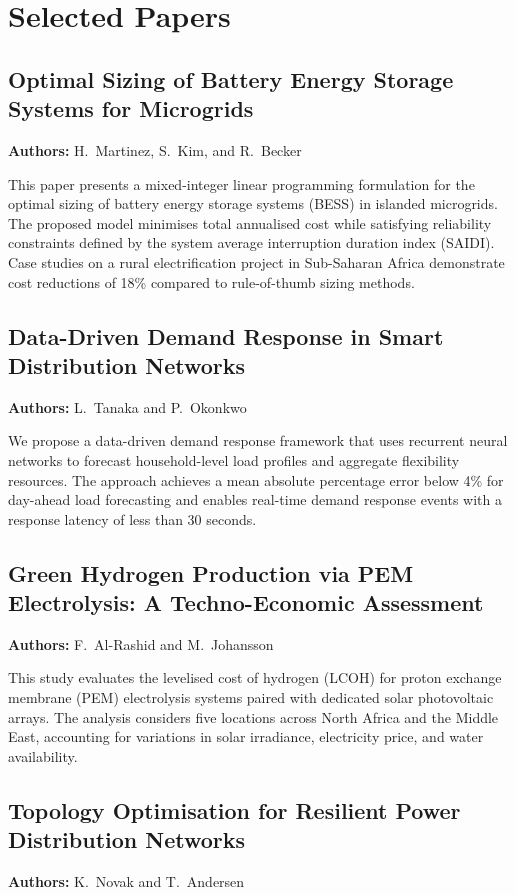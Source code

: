 \documentclass[
    language=english,
    doctype=proceedings,
    institution=none,
]{../../omnilatex}
\begin{document}
\section{Selected Papers}

\subsection{Optimal Sizing of Battery Energy Storage Systems for Microgrids}
\textbf{Authors:} H.\ Martinez, S.\ Kim, and R.\ Becker

This paper presents a mixed-integer linear programming formulation for the
optimal sizing of battery energy storage systems (BESS) in islanded
microgrids.  The proposed model minimises total annualised cost while
satisfying reliability constraints defined by the system average interruption
duration index (SAIDI).  Case studies on a rural electrification project in
Sub-Saharan Africa demonstrate cost reductions of 18\% compared to
rule-of-thumb sizing methods.

\subsection{Data-Driven Demand Response in Smart Distribution Networks}
\textbf{Authors:} L.\ Tanaka and P.\ Okonkwo

We propose a data-driven demand response framework that uses recurrent neural
networks to forecast household-level load profiles and aggregate flexibility
resources.  The approach achieves a mean absolute percentage error below 4\%
for day-ahead load forecasting and enables real-time demand response events
with a response latency of less than 30 seconds.

\subsection{Green Hydrogen Production via PEM Electrolysis: A Techno-Economic Assessment}
\textbf{Authors:} F.\ Al-Rashid and M.\ Johansson

This study evaluates the levelised cost of hydrogen (LCOH) for proton exchange
membrane (PEM) electrolysis systems paired with dedicated solar photovoltaic
arrays.  The analysis considers five locations across North Africa and the
Middle East, accounting for variations in solar irradiance, electricity price,
and water availability.

\subsection{Topology Optimisation for Resilient Power Distribution Networks}
\textbf{Authors:} K.\ Novak and T.\ Andersen
\end{document}
